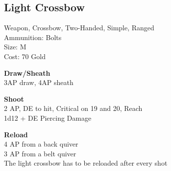 \subsection{Light Crossbow}\label{weapon:lightCrossbow}
Weapon, Crossbow, Two-Handed, Simple, Ranged\\
Ammunition: Bolts\\
Size: M\\
Cost: 70 Gold

\textbf{Draw/Sheath} \\
3AP draw, 4AP sheath

\textbf{Shoot} \\
2 AP, DE to hit, Critical on 19 and 20,  Reach\\
1d12 + \texttimes DE Piercing Damage

\textbf{Reload} \\
4 AP from a back quiver\\
3 AP from a belt quiver\\
The light crossbow has to be reloaded after every shot

